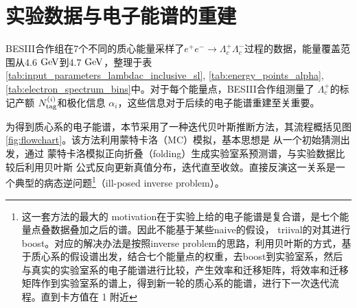 \section{实验数据与电子能谱的重建}\label{sec:exp_spectrum_rebirth}
BESIII合作组在7个不同的质心能量采样了$e^{+} e^{-} \rightarrow \Lambda_c^{+} \Lambda_c^{-}$过程的数据，能量覆盖范围从4.6 $\mathrm{GeV}$到4.7 $\mathrm{GeV}$，整理于表\ref{tab:input_parameters_lambdac_inclusive_sl}, \ref{tab:energy_points_alpha}, \ref{tab:electron_spectrum_bins}中。对于每个能量点，BESIII合作组测量了 $\Lambda_c^{+}$的标记产额 $N_{\rm tag}^{(i)}$和极化信息 $\alpha_i$，这些信息对于后续的电子能谱重建至关重要。

为得到质心系的电子能谱，本节采用了一种迭代贝叶斯推断方法，其流程概括见图\ref{fig:flowchart}。该方法利用蒙特卡洛（MC）模拟，基本思想是 从一个初始猜测出发，通过
蒙特卡洛模拟正向折叠（folding）生成实验室系预测谱，与实验数据比较后利用贝叶斯
公式反向更新真值分布，迭代直至收敛。直接反演这一关系是一个典型的病态逆问题\footnote{这一套方法的最大的 motivation在于实验上给的电子能谱是复合谱，是七个能量点叠数据叠加之后的谱。因此不能基于某些naive的假设， triival的对其进行 boost。对应的解决办法是按照inverse problem的思路，利用贝叶斯的方式，基于质心系的假设谱出发，结合七个能量点的权重，去boost到实验室系，然后与真实的实验室系的电子能谱进行比较，产生效率和迁移矩阵，将效率和迁移矩阵作到实验室系的谱上，得到新一轮的质心系的能谱，进行下一次迭代流程。直到卡方值在 1 附近}（ill-posed inverse problem）。

